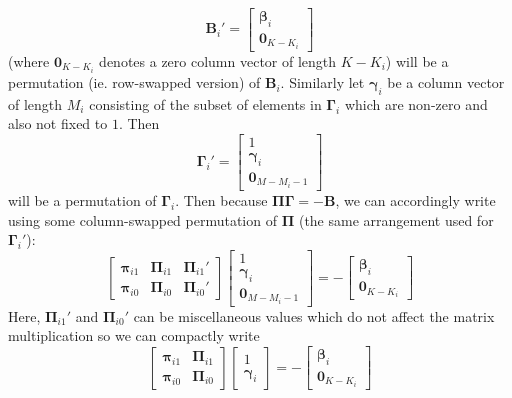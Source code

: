 \documentclass[11pt]{report} %
\begin{document}
\begin{equation}
\mathbf{B}_{i}' = \begin{bmatrix} \boldsymbol{\beta}_{i} \\ \mathbf{0}_{K - K_{i}} \end{bmatrix}
\end{equation}
(where $\mathbf{0}_{K - K_{i}}$ denotes a zero column vector of length $K - K_{i}$) will be a permutation (ie. row-swapped version) of $\mathbf{B}_{i}$. Similarly let $\boldsymbol{\gamma}_{i}$ be a column vector of length $M_{i}$ consisting of the subset of elements in $\boldsymbol{\Gamma}_{i}$ which are non-zero and also not fixed to $1$. Then
\begin{equation}
\boldsymbol{\Gamma}_{i}' = \begin{bmatrix} 1 \\ \boldsymbol{\gamma}_{i} \\ \mathbf{0}_{M - M_{i} - 1} \end{bmatrix}
\end{equation}
will be a permutation of $\boldsymbol{\Gamma}_{i}$. Then because $\boldsymbol{\Pi}\boldsymbol{\Gamma} = -\mathbf{B}$, we can accordingly write using some column-swapped permutation of $\boldsymbol{\Pi}$ (the same arrangement used for $\boldsymbol{\Gamma}_{i}'$):
\begin{equation}
\begin{bmatrix}
\boldsymbol{\pi}_{i1} & \boldsymbol{\Pi}_{i1} & \boldsymbol{\Pi}_{i1}' \\
\boldsymbol{\pi}_{i0} & \boldsymbol{\Pi}_{i0} & \boldsymbol{\Pi}_{i0}'
\end{bmatrix}\begin{bmatrix} 1 \\ \boldsymbol{\gamma}_{i} \\ \mathbf{0}_{M - M_{i} - 1} \end{bmatrix} = -\begin{bmatrix} \boldsymbol{\beta}_{i} \\ \mathbf{0}_{K - K_{i}} \end{bmatrix}
\end{equation}
Here, $\boldsymbol{\Pi}_{i1}'$ and $\boldsymbol{\Pi}_{i0}'$ can be miscellaneous values which do not affect the matrix multiplication so we can compactly write
\begin{equation}
\begin{bmatrix}
\boldsymbol{\pi}_{i1} & \boldsymbol{\Pi}_{i1}  \\
\boldsymbol{\pi}_{i0} & \boldsymbol{\Pi}_{i0} 
\end{bmatrix}\begin{bmatrix} 1 \\ \boldsymbol{\gamma}_{i}\end{bmatrix} = -\begin{bmatrix} \boldsymbol{\beta}_{i} \\ \mathbf{0}_{K - K_{i}} \end{bmatrix}
\end{equation}
\end{document}

